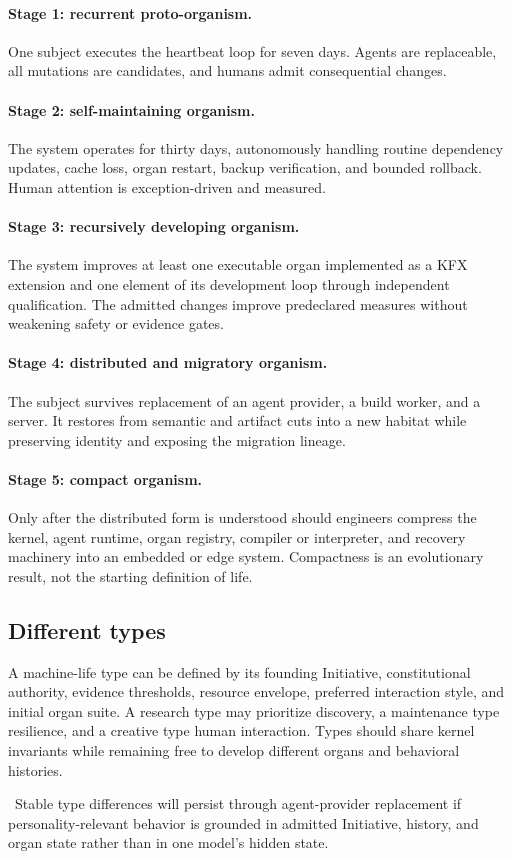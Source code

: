 \paragraph{Stage 1: recurrent proto-organism.}
One subject executes the heartbeat loop for seven days. Agents are replaceable,
all mutations are candidates, and humans admit consequential changes.

\paragraph{Stage 2: self-maintaining organism.}
The system operates for thirty days, autonomously handling routine dependency
updates, cache loss, organ restart, backup verification, and bounded rollback.
Human attention is exception-driven and measured.

\paragraph{Stage 3: recursively developing organism.}
The system improves at least one executable organ implemented as a KFX
extension and one element of its development loop through independent
qualification. The admitted changes improve
predeclared measures without weakening safety or evidence gates.

\paragraph{Stage 4: distributed and migratory organism.}
The subject survives replacement of an agent provider, a build worker, and a
server. It restores from semantic and artifact cuts into a new habitat while
preserving identity and exposing the migration lineage.

\paragraph{Stage 5: compact organism.}
Only after the distributed form is understood should engineers compress the
kernel, agent runtime, organ registry, compiler or interpreter, and recovery
machinery into an embedded or edge system. Compactness is an evolutionary
result, not the starting definition of life.

\subsection{Different types}

A machine-life type can be defined by its founding Initiative, constitutional
authority, evidence thresholds, resource envelope, preferred interaction
style, and initial organ suite. A research type may prioritize discovery, a
maintenance type resilience, and a creative type human interaction. Types
should share kernel invariants while remaining free to develop different
organs and behavioral histories.

\hypothesislabel\ Stable type differences will persist through agent-provider
replacement if personality-relevant behavior is grounded in admitted
Initiative, history, and organ state rather than in one model's hidden state.
